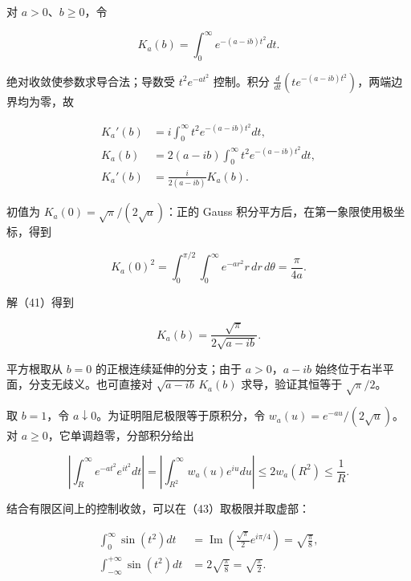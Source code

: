 \documentclass[11pt,a4paper]{article}
\begin{document}
对 \(a>0\)、\(b\ge0\)，令

\begin{equation}
K_a(b)=\int_0^\infty e^{-(a-ib)t^2}dt.
\tag{40}
\end{equation}

绝对收敛使参数求导合法；导数受 \(t^2e^{-at^2}\) 控制。积分
\(\frac{d}{dt}(t e^{-(a-ib)t^2})\)，两端边界均为零，故

\begin{equation}
\begin{aligned}
K_a'(b)&=i\int_0^\infty t^2e^{-(a-ib)t^2}dt,\\
K_a(b)&=2(a-ib)\int_0^\infty t^2e^{-(a-ib)t^2}dt,\\
K_a'(b)&=\frac{i}{2(a-ib)}K_a(b).
\end{aligned}
\tag{41}
\end{equation}

初值为 \(K_a(0)=\sqrt\pi/(2\sqrt a)\)：正的 Gauss
积分平方后，在第一象限使用极坐标，得到

\begin{equation}
K_a(0)^2=\int_0^{\pi/2}\int_0^\infty e^{-ar^2}r\,dr\,d\theta
=\frac\pi{4a}.
\tag{42}
\end{equation}

解（41）得到

\begin{equation}
K_a(b)=\frac{\sqrt\pi}{2\sqrt{a-ib}}.
\tag{43}
\end{equation}

平方根取从 \(b=0\) 的正根连续延伸的分支；由于 \(a>0\)，\(a-ib\)
始终位于右半平面，分支无歧义。也可直接对 \(\sqrt{a-ib}\,K_a(b)\)
求导，验证其恒等于 \(\sqrt\pi/2\)。

取 \(b=1\)，令 \(a\downarrow0\)。为证明阻尼极限等于原积分，令
\(w_a(u)=e^{-au}/(2\sqrt u)\)。对 \(a\ge0\)，它单调趋零，分部积分给出

\begin{equation}
\left|\int_R^\infty e^{-at^2}e^{it^2}dt\right|
=\left|\int_{R^2}^\infty w_a(u)e^{iu}du\right|
\le2w_a(R^2)\le\frac1R.
\tag{44}
\end{equation}

结合有限区间上的控制收敛，可以在（43）取极限并取虚部：

\begin{equation}
\begin{aligned}
\int_0^\infty\sin(t^2)dt
&=\operatorname{Im}\left(\frac{\sqrt\pi}{2}e^{i\pi/4}\right)
=\sqrt{\frac\pi8},\\
\int_{-\infty}^{+\infty}\sin(t^2)dt
&=2\sqrt{\frac\pi8}=\sqrt{\frac\pi2}.
\end{aligned}
\tag{45}
\end{equation}
\end{document}
